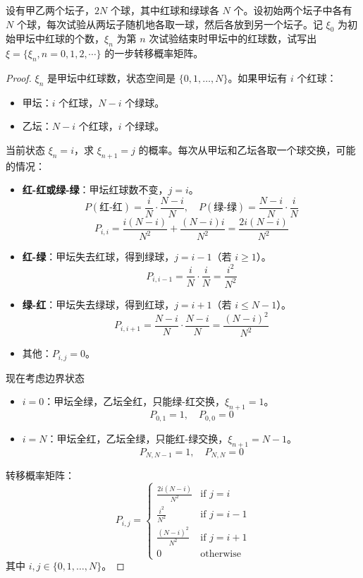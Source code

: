 \documentclass[lang=cn,10pt,thmcnt=section]{elegantbook}
\begin{document}
\begin{example}
	设有甲乙两个坛子，$2N$ 个球，其中红球和绿球各 $N$ 个。设初始两个坛子中各有 $N$ 个球，每次试验从两坛子随机地各取一球，然后各放到另一个坛子。记 $\xi_0$ 为初始甲坛中红球的个数，$\xi_n$ 为第 $n$ 次试验结束时甲坛中的红球数，试写出 $\xi = \{\xi_n, n = 0, 1, 2, \cdots\}$ 的一步转移概率矩阵。
\end{example}
\begin{proof}
	\(\xi_n\) 是甲坛中红球数，状态空间是 \(\{0, 1, \dots, N\}\)。如果甲坛有 \(i\) 个红球：
\begin{itemize}
    \item 甲坛：\(i\) 个红球，\(N-i\) 个绿球。
    \item 乙坛：\(N-i\) 个红球，\(i\) 个绿球。
\end{itemize}

当前状态 \(\xi_n = i\)，求 \(\xi_{n+1} = j\) 的概率。每次从甲坛和乙坛各取一个球交换，可能的情况：
\begin{itemize}
    \item \textbf{红-红或绿-绿}：甲坛红球数不变，\(j = i\)。
    \[
    P(\text{红-红}) = \frac{i}{N} \cdot \frac{N-i}{N}, \quad P(\text{绿-绿}) = \frac{N-i}{N} \cdot \frac{i}{N}
    \]
    \[
    P_{i,i} = \frac{i(N-i)}{N^2} + \frac{(N-i)i}{N^2} = \frac{2i(N-i)}{N^2}
    \]
    \item \textbf{红-绿}：甲坛失去红球，得到绿球，\(j = i-1\)（若 \(i \geq 1\)）。
    \[
    P_{i,i-1} = \frac{i}{N} \cdot \frac{i}{N} = \frac{i^2}{N^2}
    \]
    \item \textbf{绿-红}：甲坛失去绿球，得到红球，\(j = i+1\)（若 \(i \leq N-1\)）。
    \[
    P_{i,i+1} = \frac{N-i}{N} \cdot \frac{N-i}{N} = \frac{(N-i)^2}{N^2}
    \]
    \item 其他：\(P_{i,j} = 0\)。
\end{itemize}

现在考虑边界状态
\begin{itemize}
    \item \(i = 0\)：甲坛全绿，乙坛全红，只能绿-红交换，\(\xi_{n+1} = 1\)。
    \[
    P_{0,1} = 1, \quad P_{0,0} = 0
    \]
    \item \(i = N\)：甲坛全红，乙坛全绿，只能红-绿交换，\(\xi_{n+1} = N-1\)。
    \[
    P_{N,N-1} = 1, \quad P_{N,N} = 0
    \]
\end{itemize}
转移概率矩阵：
\[
P_{i,j} = \begin{cases}
\frac{2i(N-i)}{N^2} & \text{if } j = i \\
\frac{i^2}{N^2} & \text{if } j = i-1 \\
\frac{(N-i)^2}{N^2} & \text{if } j = i+1 \\
0 & \text{otherwise}
\end{cases}
\]
其中 \(i, j \in \{0, 1, \dots, N\}\)。
\end{proof}
\end{document}
